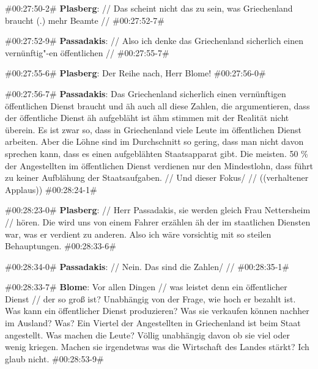 \begin{description}
\begin{linenumbers}[1]
		\item \#00:27:50-2\#  \textbf{Plasberg}: // Das scheint nicht das zu sein, was Griechenland braucht (.) mehr Beamte // \#00:27:52-7\#
		
		\item \#00:27:52-9\# \textbf{Passadakis}: // Also ich denke das Griechenland sicherlich einen vernünftig"-en öffentlichen // \#00:27:55-7\#
		
		\item \#00:27:55-6\# \textbf{Plasberg}: Der Reihe nach, Herr Blome! \#00:27:56-0\#
		
		\item \#00:27:56-7\# \textbf{Passadakis}: Das Griechenland sicherlich einen vernünftigen öffentlichen Dienst braucht und äh auch all diese Zahlen, die argumentieren, dass der öffentliche Dienst äh aufgebläht ist ähm stimmen mit der Realität nicht überein.  Es ist zwar so, dass in Griechenland viele Leute im öffentlichen Dienst arbeiten. Aber die Löhne sind im Durchschnitt so gering, dass man nicht davon sprechen kann, dass es einen aufgeblähten Staatsapparat gibt. Die meisten. 50 \% der Angestellten im öffentlichen Dienst verdienen nur den Mindestlohn, dass führt zu keiner Aufblähung der Staatsaufgaben.  // Und dieser Fokus/ // ((verhaltener Applaus))  \#00:28:24-1\#
		
		\item \#00:28:23-0\# \textbf{Plasberg}: // Herr Passadakis, sie werden gleich Frau Nettersheim // hören.  Die wird uns von einem Fahrer erzählen äh der im staatlichen Diensten war, was er verdient zu anderen. Also ich wäre vorsichtig mit so steilen Behauptungen. \#00:28:33-6\#
		
		\item \#00:28:34-0\# \textbf{Passadakis}: // Nein. Das sind die Zahlen/ // \#00:28:35-1\#
		
		\item \#00:28:33-7\# \textbf{Blome}: Vor allen Dingen // was leistet denn ein öffentlicher Dienst // der so groß ist? Unabhängig von der Frage, wie hoch er bezahlt ist. Was kann ein öffentlicher Dienst produzieren? Was sie verkaufen können nachher im Ausland? Was? Ein Viertel der Angestellten in Griechenland ist beim Staat angestellt. Was machen die Leute? Völlig unabhängig davon ob sie viel oder wenig kriegen.  Machen sie irgendetwas was die Wirtschaft des Landes stärkt? Ich glaub nicht. \#00:28:53-9\# 
		

\end{linenumbers}
\end{description}
